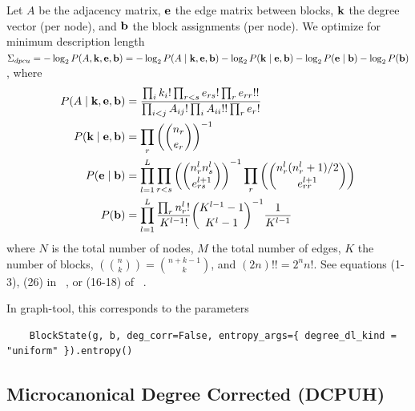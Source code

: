 \documentclass[aps,pre,superscriptaddress]{revtex4}
\begin{document}
Let $A$ be the adjacency matrix, $\vb{e}$ the edge matrix between blocks, $\vb{k}$ the degree vector (per node), and $\vb{b}$ the block assignments (per node).
We optimize for minimum description length $\Sigma_{dpcu} = -\log_2P(A, \vb{k}, \vb{e}, \vb{b}) = -\log_2P(A \mid \vb{k}, \vb{e}, \vb{b}) - \log_2 P(\vb{k} \mid \vb{e}, \vb{b}) - \log_2 P(\vb{e} \mid \vb{b}) - \log_2 P(\vb{b}) $, where
\begin{align}
	P(A \mid \vb{k}, \vb{e}, \vb{b}) & = \frac{ \prod_i k_i! \prod_{r < s} e_{rs}! \prod_{r} e_{rr}!!} {\prod_{i < j} A_{ij}! \prod_i A_{ii}!! \prod_r e_r!}                                      \\
	P(\vb{k} \mid \vb{e}, \vb{b})    & = \prod_r \left( \binom{n_r}{e_r} \right)^{-1}                                                                                                             \\
	P(\vb{e} \mid \vb{b})            & = \prod_{l=1}^{L} \prod_{r < s} \left( \binom{n_r^l n_s^l}{e_{rs}^{l+1}} \right)^{-1} \prod_r \left( \binom{ n_r^l (n_r^l + 1) / 2 }{e_{rr}^{l+1} }\right) \\
	P(\vb{b})                        & = \prod_{l=1}^L \frac{\prod_r n_r^l!}{K^{l-1}!} \binom{ K^{l-1} - 1}{K^l - 1}^{-1} \frac{1}{K^{l-1}}
\end{align}
where $N$ is the total number of nodes, $M$ the total number of edges, $K$ the number of blocks, $\left( \binom{n}{k} \right) = \binom{n + k - 1}{k}$, and $(2n)!! = 2^n n!$.
See equations (1-3), (26) in ~\cite{peixoto17-01}, or (16-18) of ~\cite{funke19-04}.

In graph-tool, this corresponds to the parameters
\begin{verbatim}
    BlockState(g, b, deg_corr=False, entropy_args={ degree_dl_kind = "uniform" }).entropy()
\end{verbatim}

\subsection*{Microcanonical Degree Corrected (DCPUH)}
\end{document}
